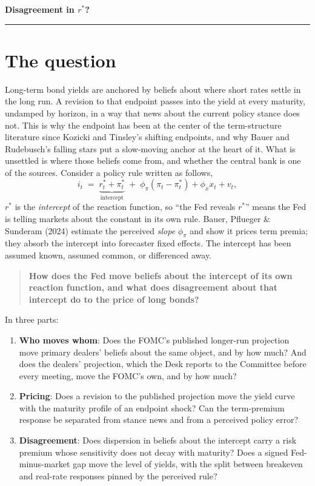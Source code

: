 \documentclass[11pt]{article}
\newcommand{\rs}{$r^{*}$}
\begin{document}
\begin{center}
{\large\textbf{Disagreement in \boldmath$r^{*}$?}}\\[0.3em]
\end{center}
\vspace{0.1em}
\noindent\rule{\textwidth}{0.4pt}
\suppressfloats[t]
\vspace{0.2em}
\section{The question}
Long-term bond yields are anchored by beliefs about where short rates settle in the long run. A revision to that endpoint passes into the yield at every maturity, undamped by horizon, in a way that news about the current policy stance does not. This is why the endpoint has been at the center of the term-structure literature since Kozicki and Tinsley's shifting endpoints, and why Bauer and Rudebusch's falling stars put a slow-moving anchor at the heart of it. What is unsettled is where those beliefs come from, and whether the central bank is one of the sources.
Consider a policy rule written as follows,
\begin{equation}
i_t \;=\; \underbrace{r^{*}_t + \pi^{*}_t}_{\text{intercept}} \;+\; \phi_\pi\!\left(\pi_t - \pi^{*}_t\right) + \phi_x x_t + v_t ,
\label{eq:rule-general}
\end{equation}
\rs{} is the \emph{intercept} of the reaction function, so ``the Fed reveals \rs{}'' means the
Fed is telling markets about the constant in its own rule. Bauer, Pflueger \& Sunderam (2024)
estimate the perceived \emph{slope} $\phi_\pi$ and show it prices term premia; they absorb the
intercept into forecaster fixed effects. The intercept has been assumed
known, assumed common, or differenced away.
\begin{quote}
\textbf{How does the Fed move beliefs about the intercept of its own reaction function, and
what does disagreement about that intercept do to the price of long bonds?}
\end{quote}
\noindent In three parts:
\begin{enumerate}
    \item \textbf{Who moves whom}: Does the FOMC's published longer-run projection move primary dealers' beliefs about the same object, and by how much? And does the dealers' projection, which the Desk reports to the Committee before every meeting, move the FOMC's own, and by how much?
    \item \textbf{Pricing}: Does a revision to the published projection move the yield curve with the maturity profile of an endpoint shock? Can the term-premium response be separated from stance news and from a perceived policy error?
    \item \textbf{Disagreement}: Does dispersion in beliefs about the intercept carry a risk premium whose sensitivity does not decay with maturity? Does a signed Fed-minus-market gap move the level of yields, with the split between breakeven and real-rate responses pinned by the perceived rule?
\end{enumerate}
\clearpage
\end{document}

